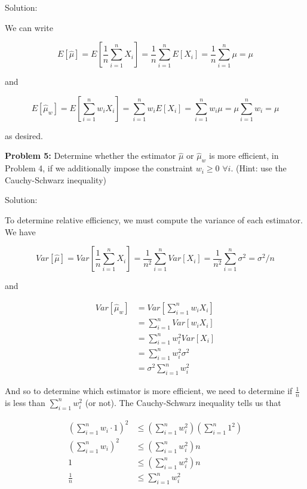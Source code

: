 \documentclass[
  letterpaper,
  DIV=11,
  numbers=noendperiod]{scrreprt}
\begin{document}
Solution:

We can write

\[
E[\hat{\mu}] = E\left[ \frac{1}{n} \sum_{i = 1}^n X_i \right] = \frac{1}{n}\sum_{i = 1}^n E[X_i] = \frac{1}{n}\sum_{i = 1}^n \mu = \mu
\]

and

\[
E[\hat{\mu}_w] = E \left[ \sum_{i = 1}^n w_i X_i \right] = \sum_{i = 1}^n w_i E \left[ X_i \right] = \sum_{i = 1}^n w_i \mu = \mu \sum_{i = 1}^n w_i = \mu
\]

as desired.

\textbf{Problem 5:} Determine whether the estimator \(\hat{\mu}\) or
\(\hat{\mu}_w\) is more efficient, in Problem 4, if we additionally
impose the constraint \(w_i \geq 0\) \(\forall i\). (Hint: use the
Cauchy-Schwarz inequality)

Solution:

To determine relative efficiency, we must compute the variance of each
estimator. We have

\[
Var[\hat{\mu}] = Var \left[ \frac{1}{n} \sum_{i = 1}^n X_i \right] = \frac{1}{n^2} \sum_{i = 1}^n Var[X_i] = \frac{1}{n^2} \sum_{i = 1}^n \sigma^2 = \sigma^2 / n
\]

and

\begin{align*}
    Var[\hat{\mu}_w] & =  Var \left[ \sum_{i = 1}^n w_i X_i \right] \\
    & = \sum_{i = 1}^n Var[w_i X_i] \\
    & = \sum_{i = 1}^n w_i^2 Var[X_i] \\
    & = \sum_{i = 1}^n w_i^2  \sigma^2 \\
    & = \sigma^2 \sum_{i = 1}^n w_i^2
\end{align*}

And so to determine which estimator is more efficient, we need to
determine if \(\frac{1}{n}\) is less than \(\sum_{i = 1}^n w_i^2\) (or
not). The Cauchy-Schwarz inequality tells us that

\begin{align*}
    \left( \sum_{i = 1}^n w_i \cdot 1\right)^2 & \leq \left( \sum_{i = 1}^n w_i^2 \right) \left( \sum_{i = 1}^n 1^2 \right) \\
    \left( \sum_{i = 1}^n w_i \right)^2 & \leq \left( \sum_{i = 1}^n w_i^2 \right) n \\
    1 & \leq \left( \sum_{i = 1}^n w_i^2 \right) n  \\
    \frac{1}{n} & \leq \sum_{i = 1}^n w_i^2
\end{align*}
\end{document}
